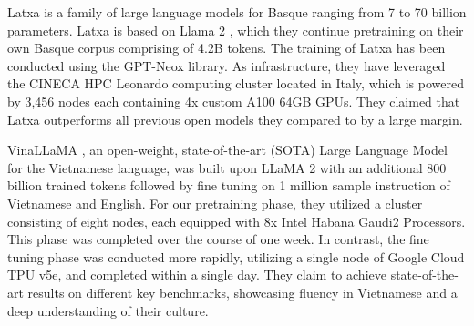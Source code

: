 Latxa \citep{27} is a family of large language models for Basque ranging from 7 to 70 billion parameters. Latxa is based on Llama 2 \citep{llama2}, which they continue pretraining on their own Basque corpus comprising of 4.2B tokens.  The training of Latxa has been conducted using the GPT-Neox \citep{28} library. As infrastructure, they have leveraged the CINECA HPC Leonardo computing cluster located in Italy, which is powered by 3,456 nodes each containing 4x custom A100 64GB GPUs. They claimed that Latxa outperforms all previous open models they compared to by a large margin. 

\begin{table*}[ht]
    \centering
    \caption{Summary of Token Count Reduction Across Different Data Sources for Urdu-LLaMA}
    \label{tab:token_reduction}
    \renewcommand{\arraystretch}{1.5} %
\end{table*}
VinaLLaMA \citep{31}, an open-weight, state-of-the-art (SOTA) Large Language Model for the Vietnamese language, was built upon LLaMA 2 \citep{llama2} with an additional 800 billion trained tokens followed by fine tuning on 1 million sample instruction of Vietnamese and English. For our pretraining phase, they utilized a cluster consisting of eight nodes, each equipped with 8x Intel Habana Gaudi2 Processors. This phase was completed over the course of one week. In contrast, the fine tuning phase was conducted more rapidly, utilizing a single node of Google Cloud TPU v5e, and completed within a single day. They claim to achieve state-of-the-art results on different key benchmarks, showcasing fluency in Vietnamese and a deep understanding of their culture.

